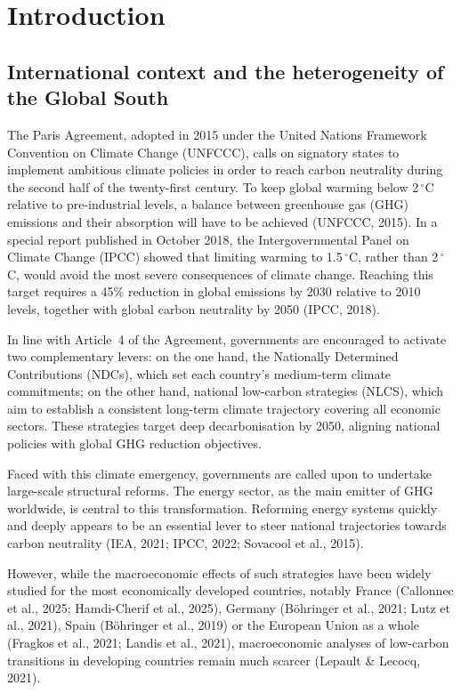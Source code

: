 \documentclass[12pt, a4paper]{article}
\begin{document}
\newpage

\section{Introduction}
\label{sec:introduction}

\subsection{International context and the heterogeneity of the Global South}

The Paris Agreement, adopted in 2015 under the United Nations Framework Convention on Climate Change (UNFCCC), calls on signatory states to implement ambitious climate policies in order to reach carbon neutrality during the second half of the twenty-first century. To keep global warming below 2\,$^{\circ}$C relative to pre-industrial levels, a balance between greenhouse gas (GHG) emissions and their absorption will have to be achieved (UNFCCC, 2015). In a special report published in October 2018, the Intergovernmental Panel on Climate Change (IPCC) showed that limiting warming to 1.5\,$^{\circ}$C, rather than 2\,$^{\circ}$C, would avoid the most severe consequences of climate change. Reaching this target requires a 45\% reduction in global emissions by 2030 relative to 2010 levels, together with global carbon neutrality by 2050 (IPCC, 2018).

In line with Article~4 of the Agreement, governments are encouraged to activate two complementary levers: on the one hand, the Nationally Determined Contributions (NDCs), which set each country's medium-term climate commitments; on the other hand, national low-carbon strategies (NLCS), which aim to establish a consistent long-term climate trajectory covering all economic sectors. These strategies target deep decarbonisation by 2050, aligning national policies with global GHG reduction objectives.

Faced with this climate emergency, governments are called upon to undertake large-scale structural reforms. The energy sector, as the main emitter of GHG worldwide, is central to this transformation. Reforming energy systems quickly and deeply appears to be an essential lever to steer national trajectories towards carbon neutrality (IEA, 2021; IPCC, 2022; Sovacool et al., 2015).

However, while the macroeconomic effects of such strategies have been widely studied for the most economically developed countries, notably France (Callonnec et al., 2025; Hamdi-Cherif et al., 2025), Germany (Böhringer et al., 2021; Lutz et al., 2021), Spain (Böhringer et al., 2019) or the European Union as a whole (Fragkos et al., 2021; Landis et al., 2021), macroeconomic analyses of low-carbon transitions in developing countries remain much scarcer (Lepault \& Lecocq, 2021).
\end{document}
